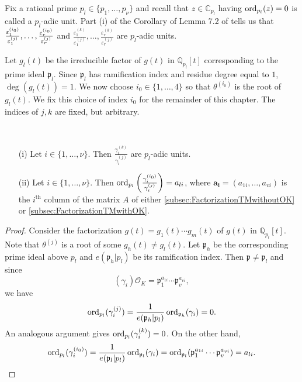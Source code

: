 Fix a rational prime $p_l \in \{p_1, \dots, p_{\nu}\}$ and recall that $z \in \mathbb{C}_{p_l}$ having $\operatorname{ord}_{p_l}(z) = 0$ is called a $p_l$-adic unit. Part (i) of the Corollary of Lemma 7.2 of \cite{TW3} tells us that $\frac{\varepsilon_1^{(i_0)}}{\varepsilon_1^{(j)}}, \dots, \frac{\varepsilon_r^{(i_0)}}{\varepsilon_r^{(j)}}$ and $\frac{\varepsilon_1^{(k)}}{\varepsilon_1^{(j)}}, \dots, \frac{\varepsilon_r^{(k)}}{\varepsilon_r^{(j)}}$ are $p_l$-adic units. 

Let $g_l(t)$ be the irreducible factor of $g(t)$ in $\mathbb{Q}_{p_l}[t]$ corresponding to the prime ideal $\mathfrak{p}_l$. Since $\mathfrak{p}_l$ has ramification index and residue degree equal to $1$, $\deg(g_l(t)) = 1$. We now choose $i_0 \in \{1, \dots, 4\}$ so that $\theta^{(i_0)}$ is the root of $g_l(t)$. We fix this choice of index $i_0$ for the remainder of this chapter. The indices of $j,k$ are fixed, but arbitrary. 

\begin{lemma} \label{lem:SunitUnits} \
\begin{enumerate}
\item[(i)] Let $i \in \{1, \dots, \nu\}$. Then $\frac{\gamma_i^{(k)}}{\gamma_i^{(j)}}$ are $p_l$-adic units. 
\item[(ii)] Let $i \in \{1, \dots, \nu\}$. Then $\operatorname{ord}_{p_l}\left(\frac{\gamma_i^{(i_0)}}{\gamma_i^{(j)}}\right) = a_{li}$, where $\mathbf{a_i} = (a_{1i}, \dots, a_{vi})$ is the $i^{\text{th}}$ column of the matrix $A$ of either \autoref{subsec:FactorizationTMwithoutOK} or \autoref{subsec:FactorizationTMwithOK}. 
\end{enumerate}
\end{lemma}

\begin{proof}
Consider the factorization $g(t) = g_1(t) \cdots g_m(t)$ of $g(t)$ in $\mathbb{Q}_{p_l}[t]$. Note that $\theta^{(j)}$ is a root of some $g_h(t) \neq g_l(t)$. Let $\mathfrak{p}_h$ be the corresponding prime ideal above $p_l$ and $e(\mathfrak{p}_h|p_l)$ be its ramification index. Then $\mathfrak{p} \neq \mathfrak{p}_l$ and since 
\[(\gamma_i)\mathcal{O}_K = \mathfrak{p}_1^{a_{1i}} \cdots \mathfrak{p}_v^{a_{vi}},\]
we have 
\[\operatorname{ord}_{p_l}(\gamma_i^{(j)}) = \frac{1}{e(\mathfrak{p}_h|p_l)}\operatorname{ord}_{\mathfrak{p}_h}(\gamma_i) = 0.\]
An analogous argument gives $\operatorname{ord}_{p_l}(\gamma_i^{(k)}) = 0$. On the other hand, 
\[\operatorname{ord}_{p_l}(\gamma_i^{(i_0)}) = \frac{1}{e(\mathfrak{p}_l|p_l)}\operatorname{ord}_{\mathfrak{p}_l}(\gamma_i) = \operatorname{ord}_{\mathfrak{p}_l}(\mathfrak{p}_1^{a_{1i}} \cdots \mathfrak{p}_v^{a_{vi}}) = a_{li}.\]
\end{proof}

